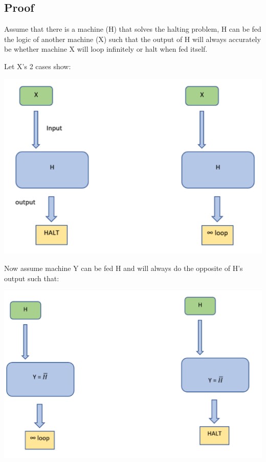 \documentclass[journal,12pt,onecolumn,draftclsnofoot,]{IEEEtran}
\begin{document}
\subsection{Proof}

Assume that there is a machine (H) that solves the halting problem, H can be fed the logic of another machine (X) such that the output of H will always accurately be whether machine X  will loop infinitely or halt when fed itself. 

Let X’s 2 cases show: 
\begin{center}
  \includegraphics[scale=0.3]{1}
\end{center} 

Now assume machine Y can be fed H and will always do the opposite of H’s output such that: 

 
\begin{center}
  \includegraphics[scale=0.3]{2}
\end{center} 
\end{document}
